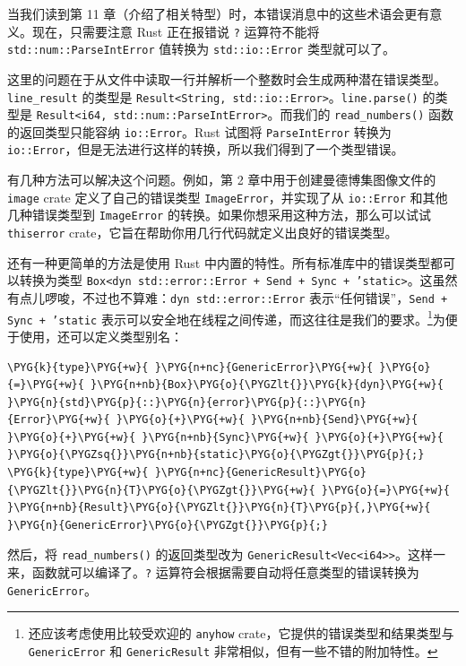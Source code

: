 当我们读到第 11 章（介绍了相关特型）时，本错误消息中的这些术语会更有意义。现在，只需要注意 Rust 正在报错说 \texttt{?} 运算符不能将 \texttt{std::num::ParseIntError} 值转换为 \texttt{std::io::Error} 类型就可以了。

这里的问题在于从文件中读取一行并解析一个整数时会生成两种潜在错误类型。\texttt{line\_result} 的类型是 \texttt{Result<String, std::io::Error>}。\texttt{line.parse()} 的类型是 \texttt{Result<i64, std::num::ParseIntError>}。而我们的 \texttt{read\_numbers()} 函数的返回类型只能容纳 \texttt{io::Error}。Rust 试图将 \texttt{ParseIntError} 转换为 \texttt{io::Error}，但是无法进行这样的转换，所以我们得到了一个类型错误。

有几种方法可以解决这个问题。例如，第 2 章中用于创建曼德博集图像文件的 \texttt{image} crate 定义了自己的错误类型 \texttt{ImageError}，并实现了从 \texttt{io::Error} 和其他几种错误类型到 \texttt{ImageError} 的转换。如果你想采用这种方法，那么可以试试 \texttt{thiserror} crate，它旨在帮助你用几行代码就定义出良好的错误类型。

还有一种更简单的方法是使用 Rust 中内置的特性。所有标准库中的错误类型都可以转换为类型 \texttt{Box<dyn std::error::Error + Send + Sync + 'static>}。这虽然有点儿啰唆，不过也不算难：\texttt{dyn std::error::Error} 表示“任何错误”，\texttt{Send + Sync + 'static} 表示可以安全地在线程之间传递，而这往往是我们的要求。\footnote{还应该考虑使用比较受欢迎的 \texttt{anyhow} crate，它提供的错误类型和结果类型与 \texttt{GenericError} 和 \texttt{GenericResult} 非常相似，但有一些不错的附加特性。}为便于使用，还可以定义类型别名：

\begin{Verbatim}[commandchars=\\\{\},breaklines=true,breakanywhere=true,fontsize=\codefont,xleftmargin=17bp]
\PYG{k}{type}\PYG{+w}{ }\PYG{n+nc}{GenericError}\PYG{+w}{ }\PYG{o}{=}\PYG{+w}{ }\PYG{n+nb}{Box}\PYG{o}{\PYGZlt{}}\PYG{k}{dyn}\PYG{+w}{ }\PYG{n}{std}\PYG{p}{::}\PYG{n}{error}\PYG{p}{::}\PYG{n}{Error}\PYG{+w}{ }\PYG{o}{+}\PYG{+w}{ }\PYG{n+nb}{Send}\PYG{+w}{ }\PYG{o}{+}\PYG{+w}{ }\PYG{n+nb}{Sync}\PYG{+w}{ }\PYG{o}{+}\PYG{+w}{ }\PYG{o}{\PYGZsq{}}\PYG{n+nb}{static}\PYG{o}{\PYGZgt{}}\PYG{p}{;}
\PYG{k}{type}\PYG{+w}{ }\PYG{n+nc}{GenericResult}\PYG{o}{\PYGZlt{}}\PYG{n}{T}\PYG{o}{\PYGZgt{}}\PYG{+w}{ }\PYG{o}{=}\PYG{+w}{ }\PYG{n+nb}{Result}\PYG{o}{\PYGZlt{}}\PYG{n}{T}\PYG{p}{,}\PYG{+w}{ }\PYG{n}{GenericError}\PYG{o}{\PYGZgt{}}\PYG{p}{;}
\end{Verbatim}

然后，将 \texttt{read\_numbers()} 的返回类型改为 \texttt{GenericResult<Vec<i64>>}。这样一来，函数就可以编译了。\texttt{?} 运算符会根据需要自动将任意类型的错误转换为 \texttt{GenericError}。

